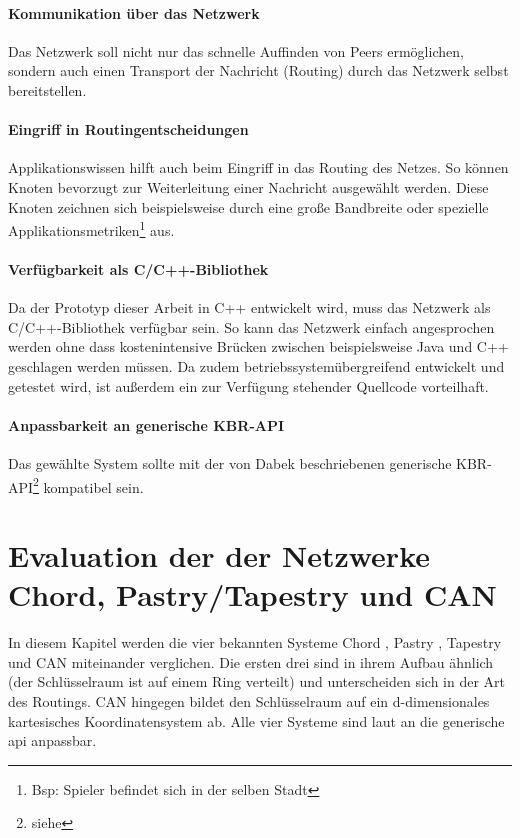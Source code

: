 \paragraph{Kommunikation über das Netzwerk} Das Netzwerk soll nicht nur das schnelle Auffinden von Peers ermöglichen, sondern auch einen Transport der Nachricht (Routing) durch das Netzwerk selbst bereitstellen.

\paragraph{Eingriff in Routingentscheidungen} Applikationswissen hilft auch beim Eingriff in das Routing des Netzes. So können Knoten bevorzugt zur Weiterleitung einer Nachricht ausgewählt werden. Diese Knoten zeichnen sich beispielsweise durch eine große Bandbreite oder spezielle Applikationsmetriken\footnote{Bsp: Spieler befindet sich in der selben Stadt} aus.

\paragraph{Verfügbarkeit als C/C++-Bibliothek} Da der Prototyp dieser Arbeit in C++ entwickelt wird, muss das Netzwerk als C/C++-Bibliothek verfügbar sein. So kann das Netzwerk einfach angesprochen werden ohne dass kostenintensive Brücken zwischen beispielsweise Java und C++ geschlagen werden müssen. Da zudem betriebssystemübergreifend entwickelt und getestet wird, ist außerdem ein zur Verfügung stehender Quellcode vorteilhaft.

\paragraph{Anpassbarkeit an generische KBR-API}
Das gewählte System sollte mit der von Dabek beschriebenen generische KBR-API\footnote{siehe } kompatibel sein.

\section[Evaluation dreier p2p-Netzwerke]{Evaluation der der Netzwerke Chord, Pastry/Tapestry und CAN}
In diesem Kapitel werden die vier bekannten Systeme Chord \cite{Stoica2003}, Pastry \cite{Rowstron2001}, Tapestry \cite{Zhao2001Tapestry,Zhao2004Tapestry} und CAN \cite{Ratnasamy2001Scalable} miteinander verglichen. Die ersten drei sind in ihrem Aufbau ähnlich (der Schlüsselraum ist auf einem Ring verteilt) und unterscheiden sich in der Art des Routings. CAN hingegen bildet den Schlüsselraum auf ein d-dimensionales kartesisches Koordinatensystem ab. Alle vier Systeme sind laut \cite{Dabek2003Towards} an die generische \ac{api} anpassbar.

